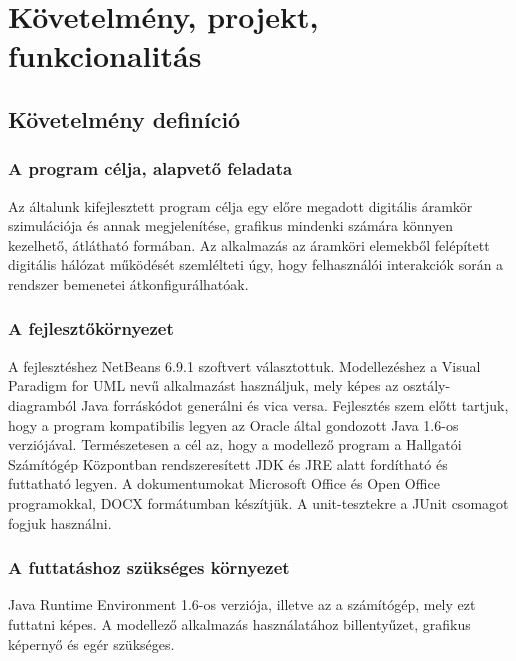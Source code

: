 %
\chapter{Követelmény, projekt, funkcionalitás}

\thispagestyle{fancy}


\section{Követelmény definíció}

\subsection{A program célja, alapvető feladata}

Az általunk kifejlesztett program célja egy előre megadott digitális áramkör szimulációja és annak megjelenítése, grafikus mindenki számára könnyen kezelhető, átlátható formában. Az alkalmazás az áramköri elemekből felépített digitális hálózat működését szemlélteti úgy, hogy felhasználói interakciók során a rendszer bemenetei átkonfigurálhatóak.

\subsection{A fejlesztőkörnyezet}

A fejlesztéshez NetBeans 6.9.1 szoftvert választottuk. Modellezéshez a Visual Paradigm for UML nevű alkalmazást használjuk, mely képes az osztály-diagramból Java forráskódot generálni és vica versa. Fejlesztés szem előtt tartjuk, hogy a program kompatibilis legyen az Oracle által gondozott Java 1.6-os verziójával. Természetesen a cél az, hogy a modellező program a Hallgatói Számítógép Központban rendszeresített JDK és JRE alatt fordítható és futtatható legyen. A dokumentumokat Microsoft Office és Open Office programokkal, DOCX formátumban készítjük. A unit-tesztekre a JUnit csomagot fogjuk használni.

\subsection{A futtatáshoz szükséges környezet}

Java Runtime Environment 1.6-os verziója, illetve az a számítógép, mely ezt futtatni képes. A modellező alkalmazás használatához billentyűzet, grafikus képernyő és egér szükséges.

